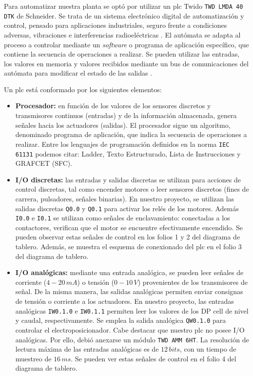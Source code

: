 Para automatizar nuestra planta se optó por utilizar un \gls{plc} Twido
\verb|TWD LMDA 40 DTK| de Schneider.
Se trata de un sistema electrónico digital de automatización y control, pensado
para aplicaciones industriales, seguro frente a condiciones adversas,
vibraciones e interferencias radioeléctricas \cite{bib:ApuntesJGabriel}.
El autómata se adapta al proceso a controlar mediante un
\textit{software} o programa de aplicación específico, que contiene la secuencia
de operaciones a realizar.
Se pueden utilizar las entradas, los valores en memoria y valores
recibidos mediante un bus de comunicaciones del autómata para modificar el
estado de las salidas \cite{bib:libroAutomat1}.

Un \gls{plc} está conformado por los siguientes elementos:
\begin{itemize}
 \item \textbf{Procesador:} en función de los valores de los sensores discretos
y transmisores continuos (entradas) y de la información almacenada,
genera señales hacia los
actuadores
(salidas).
El procesador sigue un algoritmo, denominado programa de aplicación,
que indica la secuencia de operaciones a realizar.
Entre los lenguajes de programación definidos en la norma \verb|IEC 61131|
podemos citar: Ladder, Texto Estructurado, Lista de Instrucciones y GRAFCET
(SFC).
 \item \textbf{I/O discretas:} las entradas y salidas discretas se
utilizan para acciones de control discretas, tal como encender motores
o leer sensores discretos (fines de carrera, pulsadores, señales binarias).
En nuestro proyecto, se utilizan las salidas discretas \verb|Q0.0| y \verb|Q0.1|
para activar los relés de los motores.
Además \verb|I0.0| e \verb|I0.1| se
utilizan como señales de enclavamiento: conectadas a los contactores, verifican
que el motor se encuentre efectivamente encendido.
Se pueden observar estas señales de control en los folios 1 y 2 del diagrama de
tablero.
Además, se muestra el esquema de conexionado del \gls{plc} en el folio
3 del diagrama de tablero.
\item \textbf{I/O analógicas:} mediante una entrada
analógica, se pueden leer
señales de corriente ($4-20\,mA$) o tensión ($0-10\,V$) provenientes de los
transmisores de señal.
De la misma manera, las salidas analógicas permiten enviar consignas
de tensión o corriente a los actuadores.
En nuestro proyecto, las entradas analógicas \verb|IW0.1.0| e \verb|IW0.1.1|
permiten leer los valores de los DP cell de nivel y caudal, respectivamente.
Se emplea la salida analógica \verb|QW0.1.0| para controlar el
electroposicionador.
Cabe destacar que nuestro \gls{plc} no posee I/O analógicas.
Por ello, debió anexarse un módulo \verb|TWD AMM 6HT|.
La resolución de lectura máxima de las entradas analógicas es de $12\,bits$,
con un tiempo de muestreo de $16\,ms$.
Se pueden ver estas señales de control en el folio 4 del diagrama de tablero.


\end{itemize}
